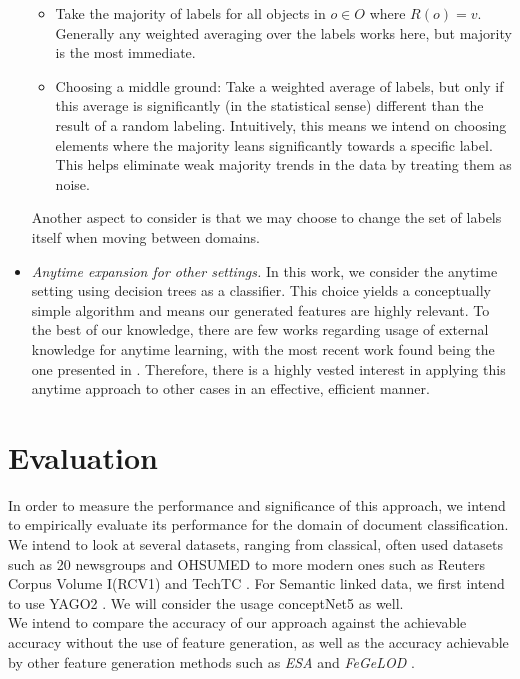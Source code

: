 \documentclass[12pt, a4paper]{article}
\theoremstyle{definition}
\begin{document}
\begin{itemize}
\begin{itemize}
            \item Take the majority of labels for all objects in $o\in O$ where $R(o)=v$. Generally any weighted averaging over the labels works here, but majority is the most immediate.
            \item Choosing a middle ground: Take a weighted average of labels, but only if this average is significantly (in the statistical sense) different than the result of a random labeling. Intuitively, this means we intend on choosing elements where the majority leans significantly towards a specific label. This helps eliminate weak majority trends in the data by treating them as noise.
        \end{itemize}
        Another aspect to consider is that we may choose to change the set of labels itself when moving between domains.
    \item \emph{Anytime expansion for other settings.} In this work, we consider the anytime setting using decision trees as a classifier. This choice yields a conceptually simple algorithm and means our generated features are highly relevant. To the best of our knowledge, there are few works regarding usage of external knowledge for anytime learning, with the most recent work found being the one presented in \citet{lindgren2000anytime}. Therefore, there is a highly vested interest in applying this anytime approach to other cases in an effective, efficient manner.
\end{itemize}

\section{Evaluation}
In order to measure the performance and significance of this approach, we intend to empirically evaluate its performance for the domain of document classification. We intend to look at several datasets, ranging from classical, often used datasets such as 20 newsgroups \citep{Lang95} and OHSUMED \citep{hersh1994ohsumed} to more modern ones such as Reuters Corpus Volume I(RCV1) \citep{lewis2004rcv1} and TechTC \citep{davidov2004parameterized}. For Semantic linked data, we first intend to use YAGO2 \citep{hoffart2013yago2}. We will consider the usage conceptNet5 \citep{speer2012representing} as well.\\

We intend to compare the accuracy of our approach against the achievable accuracy without the use of feature generation, as well as the accuracy achievable by other feature generation methods such as \emph{ESA} \citep{gabrilovich2006overcoming} and \emph{FeGeLOD} \citep{paulheim2012unsupervised}.
\end{document}
